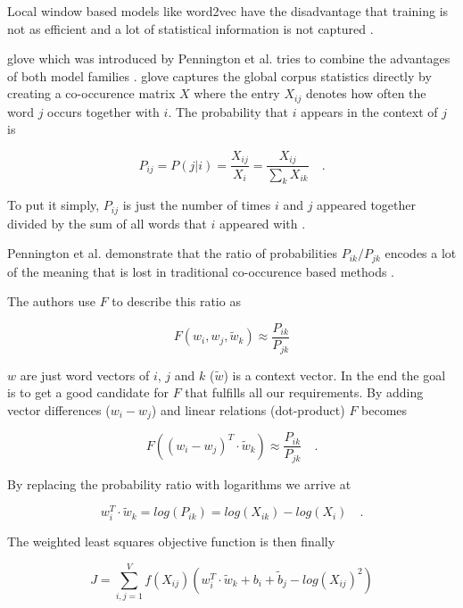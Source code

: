 Local window based models like word2vec have the disadvantage that training is not as efficient and a lot of statistical information is not captured \cite{Pennington2014a}. 
\medskip

\gls{glove} which was introduced by Pennington et al. tries to combine the advantages of both model families \cite{Pennington2014a}. \gls{glove} captures the global corpus statistics directly by creating a co-occurence matrix $X$ where the entry $X_{ij}$ denotes how often the word $j$ occurs together with $i$. The probability that $i$ appears in the context of $j$ is 

\begin{equation}
	P_{ij}=P(j|i)=\frac{X_{ij}}{X_i}=\frac{X_{ij}}{\sum_k X_{ik}}\quad.
\end{equation}

To put it simply, $P_{ij}$ is just the number of times $i$ and $j$ appeared together divided by the sum of all words that $i$ appeared with \cite{Pennington2014a}.

Pennington et al. demonstrate that the ratio of probabilities $P_{ik} / P_{jk}$  encodes a lot of the meaning that is lost in traditional co-occurence based methods \cite{Pennington2014a}.
\medskip

The authors use $F$ to describe this ratio as

\begin{equation}
	F(w_i, w_j, \widetilde{w}_k) \approx \frac{P_{ik}}{P_{jk}}
\end{equation}

$w$ are just word vectors of $i$, $j$ and $k$ {($\widetilde{w}$)} is a context vector. In the end the goal is to get a good candidate for $F$ that fulfills all our requirements. By adding vector differences {($w_i - w_j$)} and linear relations {(dot-product)} $F$ becomes

\begin{equation}
	F((w_i - w_j)^T \cdot \widetilde{w}_k) \approx \frac{P_{ik}}{P_{jk}} \quad .
\end{equation}

By replacing the probability ratio with logarithms we arrive at

\begin{equation}
	w_i^T \cdot \widetilde{w}_k = log(P_{ik}) = log(X_{ik}) - log(X_i) \quad .
\end{equation}

The weighted least squares objective function is then finally

\begin{equation}
	J = \sum_{i,j=1}^V f(X_{ij}) (w_i^T \cdot \widetilde{w}_k + b_i+\widetilde{b}_j - log(X_{ij})^2)
\end{equation}

